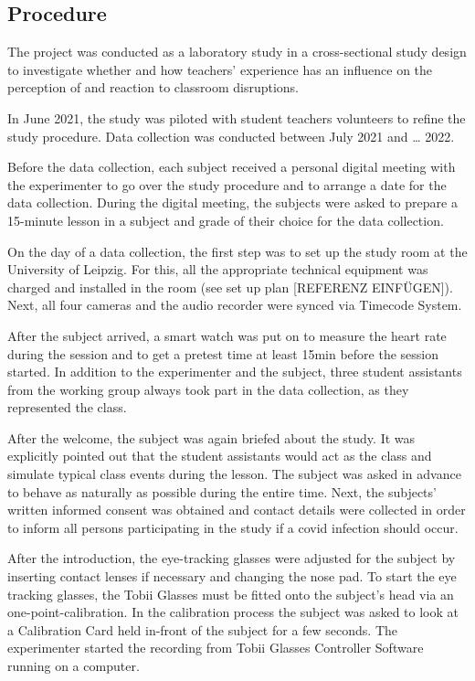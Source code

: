 \documentclass[
  man,floatsintext]{apa6}
\begin{document}
\hypertarget{procedure}{%
\subsection{Procedure}\label{procedure}}

The project was conducted as a laboratory study in a cross-sectional study design to investigate whether and how teachers' experience has an influence on the perception of and reaction to classroom disruptions.

In June 2021, the study was piloted with student teachers volunteers to refine the study procedure. Data collection was conducted between July 2021 and \ldots{} 2022.

Before the data collection, each subject received a personal digital meeting with the experimenter to go over the study procedure and to arrange a date for the data collection. During the digital meeting, the subjects were asked to prepare a 15-minute lesson in a subject and grade of their choice for the data collection.

On the day of a data collection, the first step was to set up the study room at the University of Leipzig. For this, all the appropriate technical equipment was charged and installed in the room (see set up plan {[}REFERENZ EINFÜGEN{]}). Next, all four cameras and the audio recorder were synced via Timecode System.

After the subject arrived, a smart watch was put on to measure the heart rate during the session and to get a pretest time at least 15min before the session started. In addition to the experimenter and the subject, three student assistants from the working group always took part in the data collection, as they represented the class.

After the welcome, the subject was again briefed about the study. It was explicitly pointed out that the student assistants would act as the class and simulate typical class events during the lesson. The subject was asked in advance to behave as naturally as possible during the entire time. Next, the subjects' written informed consent was obtained and contact details were collected in order to inform all persons participating in the study if a covid infection should occur.

After the introduction, the eye-tracking glasses were adjusted for the subject by inserting contact lenses if necessary and changing the nose pad. To start the eye tracking glasses, the Tobii Glasses must be fitted onto the subject's head via an one-point-calibration. In the calibration process the subject was asked to look at a Calibration Card held in-front of the subject for a few seconds. The experimenter started the recording from Tobii Glasses Controller Software running on a computer.
\end{document}
